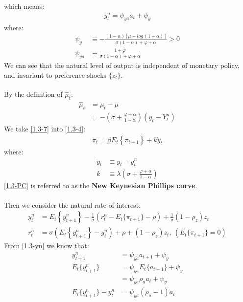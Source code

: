 \documentclass{article}
\numberwithin{equation}{section}
\begin{document}
which means:
	\begin{align}
		y^n_t = \psi_{ya} a_t + \psi_y \label{1.3-yn}
	\end{align}
where:
	\begin{align*}
		\psi_y &\equiv -\frac{(1 - \alpha)[\mu - log\,(1 - \alpha)]}{\sigma(1 - \alpha) + \varphi + \alpha} > 0\\
		\psi_{ya} &\equiv \frac{1 + \varphi}{\sigma(1 - \alpha) + \varphi + \alpha}
	\end{align*}
We can see that the natural level of output is independent of monetary policy, and invariant to preference shocks $\{ z_t \}$.\\\\
By the definition of $\hat{\mu}_t$:
	\begin{align}
		\hat{\mu}_t &= \mu_t - \mu \nonumber\\
		&= -\left( \sigma + \frac{\varphi + \alpha}{1 - \alpha} \right)(y_t - Y^n_t) \label{1.3-7}
	\end{align}
We take \eqref{1.3-7} into \eqref{1.3-4}:
	\begin{align}
		\pi_t = \beta E_t \left\{ \pi_{t+1} \right\} + k \tilde{y}_t \label{1.3-PC}
	\end{align}
where:
	\begin{align*}
		\tilde{y}_t &\equiv y_t - y^n_t\\
		k &\equiv \lambda \left( \sigma + \frac{\varphi + \alpha}{1 - \alpha} \right)
	\end{align*}
\eqref{1.3-PC} is referred to as the \textbf{New Keynesian Phillips curve}.\\\\
Then we consider the natural rate of interest:
	\begin{align*}
		y^n_t &= E_t \left\{ y^n_{t+1} \right\} - \frac{1}{\sigma}(r^n_t - E_t\{\pi_{t+1}\} - \rho) + \frac{1}{\sigma}(1 - \rho_z)z_t\\
		r^n_t &= \sigma\left( E_t \left\{ y^n_{t+1} \right\} - y^n_t \right) + \rho + (1 - \rho_z)z_t,\ (E_t\{\pi_{t+1}\} = 0)
	\end{align*}
From \eqref{1.3-yn} we know that:
	\begin{align*}
		y^n_{t+1} &= \psi_{ya} a_{t+1} + \psi_y\\
		E_t\{y^n_{t+1}\} &= \psi_{ya} E_t\{a_{t+1}\} + \psi_y\\
		&= \psi_{ya} \rho_a a_t + \psi_y\\
		E_t\{y^n_{t+1}\} - y^n_t &= \psi_{ya} (\rho_a - 1)a_t
	\end{align*}
\end{document}
